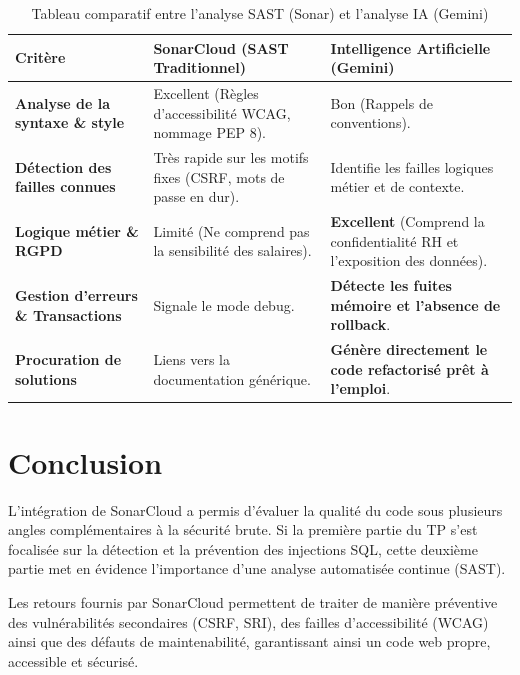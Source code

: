 \documentclass[12pt,a4paper]{article}
\begin{document}
\begin{table}[htbp]
\centering
\caption{Tableau comparatif entre l'analyse SAST (Sonar) et l'analyse IA (Gemini)}
\vspace{0.2cm}
\small
\begin{tabular}{|p{3.5cm}|p{5.5cm}|p{5.5cm}|}
\hline
\textbf{Critère} & \textbf{SonarCloud (SAST Traditionnel)} & \textbf{Intelligence Artificielle (Gemini)} \\ \hline
\textbf{Analyse de la syntaxe \& style} & Excellent (Règles d'accessibilité WCAG, nommage PEP 8). & Bon (Rappels de conventions). \\ \hline
\textbf{Détection des failles connues} & Très rapide sur les motifs fixes (CSRF, mots de passe en dur). & Identifie les failles logiques métier et de contexte. \\ \hline
\textbf{Logique métier \& RGPD} & Limité (Ne comprend pas la sensibilité des salaires). & \textbf{Excellent} (Comprend la confidentialité RH et l'exposition des données). \\ \hline
\textbf{Gestion d'erreurs \& Transactions} & Signale le mode debug. & \textbf{Détecte les fuites mémoire et l'absence de rollback}. \\ \hline
\textbf{Procuration de solutions} & Liens vers la documentation générique. & \textbf{Génère directement le code refactorisé prêt à l'emploi}. \\ \hline
\end{tabular}
\end{table}

\section{Conclusion}
L'intégration de SonarCloud a permis d'évaluer la qualité du code sous plusieurs angles complémentaires à la sécurité brute. Si la première partie du TP s'est focalisée sur la détection et la prévention des injections SQL, cette deuxième partie met en évidence l'importance d'une analyse automatisée continue (SAST).

Les retours fournis par SonarCloud permettent de traiter de manière préventive des vulnérabilités secondaires (CSRF, SRI), des failles d'accessibilité (WCAG) ainsi que des défauts de maintenabilité, garantissant ainsi un code web propre, accessible et sécurisé.
\end{document}
